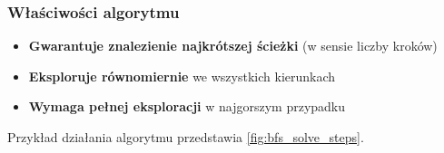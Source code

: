 \documentclass[../../../../doc.tex]{subfiles}
\begin{document}
\subsubsection{Właściwości algorytmu}
\begin{itemize}
  \item \textbf{Gwarantuje znalezienie najkrótszej ścieżki} (w sensie liczby kroków)
  \item \textbf{Eksploruje równomiernie} we wszystkich kierunkach
  \item \textbf{Wymaga pełnej eksploracji} w najgorszym przypadku
\end{itemize}


Przykład działania algorytmu przedstawia \cref{fig:bfs_solve_steps}.


\end{document}
